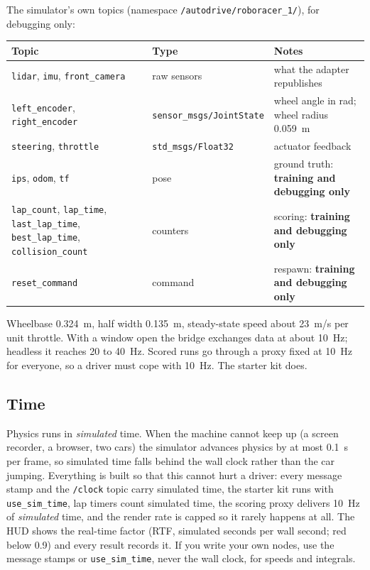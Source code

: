 \medskip
The simulator's own topics (namespace \texttt{/autodrive/roboracer\_1/}), for debugging only:

\begin{tabularx}{\linewidth}{p{5.2cm}p{4.3cm}X}
\toprule
Topic & Type & Notes\\
\midrule
\texttt{lidar}, \texttt{imu}, \texttt{front\_camera} & raw sensors & what the adapter republishes\\
\texttt{left\_encoder}, \texttt{right\_encoder} & \texttt{sensor\_msgs/JointState} & wheel angle in rad; wheel radius 0.059~m\\
\texttt{steering}, \texttt{throttle} & \texttt{std\_msgs/Float32} & actuator feedback\\
\texttt{ips}, \texttt{odom}, \texttt{tf} & pose & ground truth: \textbf{training and debugging only}\\
\texttt{lap\_count}, \texttt{lap\_time}, \texttt{last\_lap\_time}, \texttt{best\_lap\_time}, \texttt{collision\_count} & counters & scoring: \textbf{training and debugging only}\\
\texttt{reset\_command} & command & respawn: \textbf{training and debugging only}\\
\bottomrule
\end{tabularx}

\medskip
Wheelbase 0.324~m, half width 0.135~m, steady-state speed about 23~m/s per unit throttle.
With a window open the bridge exchanges data at about 10~Hz; headless it reaches 20 to
40~Hz. Scored runs go through a proxy fixed at 10~Hz for everyone, so a driver must cope
with 10~Hz. The starter kit does.

\subsection{Time}

Physics runs in \emph{simulated} time. When the machine cannot keep up (a screen recorder,
a browser, two cars) the simulator advances physics by at most 0.1~s per frame, so simulated
time falls behind the wall clock rather than the car jumping. Everything is built so that
this cannot hurt a driver: every message stamp and the \texttt{/clock} topic carry simulated
time, the starter kit runs with \texttt{use\_sim\_time}, lap timers count simulated time,
the scoring proxy delivers 10~Hz of \emph{simulated} time, and the render rate is capped so
it rarely happens at all. The HUD shows the real-time factor (RTF, simulated seconds per wall
second; red below 0.9) and every result records it. If you write your own nodes, use the
message stamps or \texttt{use\_sim\_time}, never the wall clock, for speeds and integrals.

